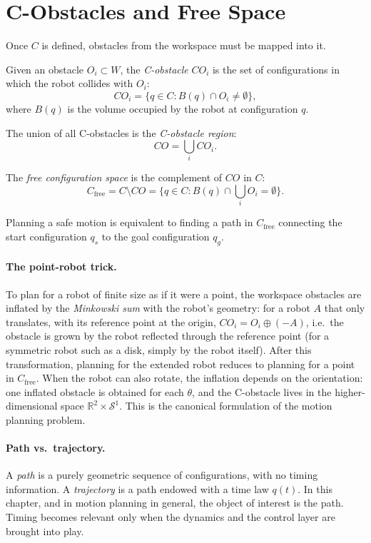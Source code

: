 \section{C-Obstacles and Free Space}
\label{sec:c-obstacles}

Once \( C \) is defined, obstacles from the workspace must be mapped
into it.

\begin{definition}[C-Obstacle]
Given an obstacle \( O_i \subset W \), the
\emph{C-obstacle} \( CO_i \) is the set of configurations in which
the robot collides with \( O_i \):
\[
CO_i = \{ q \in C : B(q) \cap O_i \neq \emptyset \},
\]
where \( B(q) \) is the volume occupied by the robot at configuration
\( q \).
\end{definition}

The union of all C-obstacles is the \emph{C-obstacle region}:
\[
CO = \bigcup_i CO_i.
\]

\begin{definition}
The \emph{free configuration space} is the complement of \( CO \) in
\( C \):
\[
C_{\text{free}} = C \setminus CO
= \{ q \in C : B(q) \cap \textstyle\bigcup_i O_i = \emptyset \}.
\]
\end{definition}

Planning a safe motion is equivalent to finding a path in
\( C_{\text{free}} \) connecting the start configuration \( q_s \) to
the goal configuration \( q_g \).

\paragraph{The point-robot trick.}
To plan for a robot of finite size as if it were a point, the workspace
obstacles are inflated by the \emph{Minkowski sum} with the robot's
geometry: for a robot \( A \) that only translates, with its reference
point at the origin, \( CO_i = O_i \oplus (-A) \), i.e.\ the obstacle
is grown by the robot reflected through the reference point (for a
symmetric robot such as a disk, simply by the robot itself). After this
transformation, planning for the extended robot reduces to planning for
a point in \( C_{\text{free}} \). When the robot can also rotate, the
inflation depends on the orientation: one inflated obstacle is obtained
for each \( \theta \), and the C-obstacle lives in the higher-dimensional
space \( \mathbb{R}^2 \times \mathcal{S}^1 \). This is the canonical
formulation of the motion planning problem.

\paragraph{Path vs.\ trajectory.}
A \emph{path} is a purely geometric sequence of configurations, with
no timing information. A \emph{trajectory} is a path endowed with a
time law \( q(t) \). In this chapter, and in motion planning in
general, the object of interest is the path. Timing becomes relevant
only when the dynamics and the control layer are brought into play.

